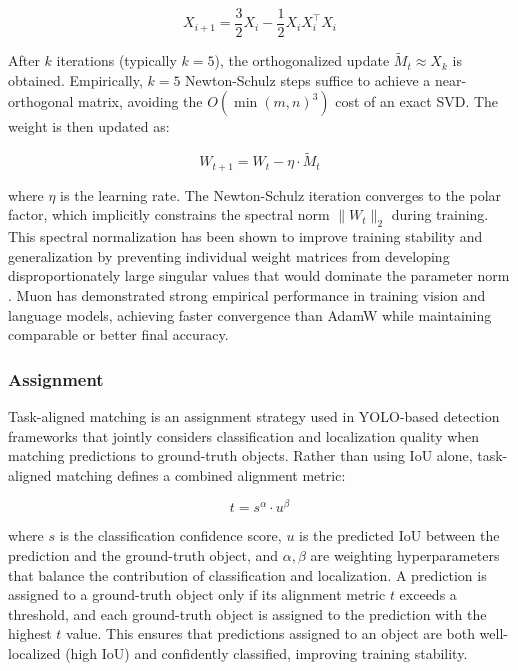 \begin{equation}
    X_{i+1} = \frac{3}{2} X_i - \frac{1}{2} X_i X_i^\top X_i
\end{equation}

After $k$ iterations (typically $k = 5$), the orthogonalized update $\widetilde{M}_t \approx X_k$ is obtained. Empirically, $k = 5$ Newton-Schulz steps suffice to achieve a near-orthogonal matrix, avoiding the $O(\min(m,n)^3)$ cost of an exact SVD. The weight is then updated as:

\begin{equation}
    W_{t+1} = W_t - \eta \cdot \widetilde{M}_t
\end{equation}

where $\eta$ is the learning rate. The Newton-Schulz iteration converges to the polar factor, which implicitly constrains the spectral norm $\|W_t\|_2$ during training. This spectral normalization has been shown to improve training stability and generalization by preventing individual weight matrices from developing disproportionately large singular values that would dominate the parameter norm \cite{chen2025muon}. Muon has demonstrated strong empirical performance in training vision and language models, achieving faster convergence than AdamW while maintaining comparable or better final accuracy.

\subsubsection{Assignment}
\label{sec:assignment}

\label{sec:tal}

Task-aligned matching is an assignment strategy used in YOLO-based detection frameworks that jointly considers classification and localization quality when matching predictions to ground-truth objects. Rather than using IoU alone, task-aligned matching defines a combined alignment metric:

\begin{equation}
	t = s^{\alpha} \cdot u^{\beta}
\end{equation}

where $s$ is the classification confidence score, $u$ is the predicted IoU between the prediction and the ground-truth object, and $\alpha, \beta$ are weighting hyperparameters that balance the contribution of classification and localization. A prediction is assigned to a ground-truth object only if its alignment metric $t$ exceeds a threshold, and each ground-truth object is assigned to the prediction with the highest $t$ value. This ensures that predictions assigned to an object are both well-localized (high IoU) and confidently classified, improving training stability.

